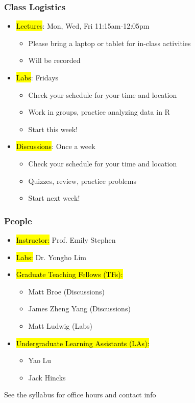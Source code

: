 \documentclass[slidestop,compress,mathserif]{beamer}
\begin{document}
\begin{frame}
	\frametitle{Class Logistics}
	\begin{itemize}
		\item \hl{Lectures}: Mon, Wed, Fri 11:15am-12:05pm
		\begin{itemize}
			\item Please bring a laptop or tablet for in-class activities
			\item Will be recorded
		\end{itemize}
		\item \hl{Labs}: Fridays
		\begin{itemize}
			\item Check your schedule for your time and location
			\item Work in groups, practice analyzing data in R
			\item Start this week!
		\end{itemize}
		\item \hl{Discussions}: Once a week
		\begin{itemize}
			\item Check your schedule for your time and location
			\item Quizzes, review, practice problems
			\item Start next week!
		\end{itemize}
	\end{itemize}
\end{frame}

\begin{frame}
	\frametitle{People}
	\begin{itemize}
		\item \hl{Instructor:} Prof. Emily Stephen
		\item \hl{Labs:} Dr. Yongho Lim
		\item \hl{Graduate Teaching Fellows (TFs):} 
		\begin{itemize}
			\item Matt Broe (Discussions)
			\item James Zheng Yang (Discussions)
			\item Matt Ludwig (Labs)
		\end{itemize}
		\item \hl{Undergraduate Learning Assistants (LAs):}
		\begin{itemize}
			\item Yao Lu
			\item Jack Hincks
		\end{itemize}
	\end{itemize}

	See the syllabus for office hours and contact info
\end{frame}
\end{document}
